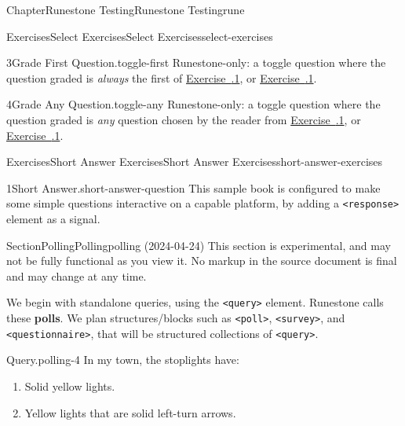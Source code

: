 \documentclass[oneside,10pt,]{book}
\newcommand{\xreffont}{\relax}
\newcommand{\mono}[1]{\texttt{#1}}
\newcommand{\terminology}[1]{\textbf{#1}}
\numberwithin{equation}{section}
\begin{document}
\begin{chapterptx}{Chapter}{Runestone Testing}{}{Runestone Testing}{}{}{rune}
\begin{exercises-section}{Exercises}{Select Exercises}{}{Select Exercises}{}{}{select-exercises}
\begin{divisionexercise}{3}{Grade First Question.}{}{toggle-first}
Runestone-only: a toggle question where the question graded is \emph{always} the first of \hyperlink{vector-space-dimension}{Exercise~{\xreffont 5.8.1}}, or \hyperlink{multiple-choice-not-randomized}{Exercise~{\xreffont 5.9.1}}.%
\end{divisionexercise}%
\begin{divisionexercise}{4}{Grade Any Question.}{}{toggle-any}%
Runestone-only: a toggle question where the question graded is \emph{any} question chosen by the reader from \hyperlink{vector-space-dimension}{Exercise~{\xreffont 5.8.1}}, or \hyperlink{multiple-choice-not-randomized}{Exercise~{\xreffont 5.9.1}}.%
\end{divisionexercise}%
\end{exercises-section}
%
%
\typeout{************************************************}
\typeout{************************************************}
%
\begin{exercises-section}{Exercises}{Short Answer Exercises}{}{Short Answer Exercises}{}{}{short-answer-exercises}
\begin{divisionexercise}{1}{Short Answer.}{}{short-answer-question}%
This sample book is configured to make some simple questions interactive on a capable platform, by adding a \mono{<response>} element as a signal.%
\end{divisionexercise}%
\end{exercises-section}
%
%
\typeout{************************************************}
\typeout{************************************************}
%
\begin{sectionptx}{Section}{Polling}{}{Polling}{}{}{polling}
(2024-04-24) This section is experimental, and may not be fully functional as you view it.  No markup in the source document is final and may change at any time.%
\par
We begin with standalone queries, using the \mono{<query>} element.  Runestone calls these \terminology{polls}.   We plan structures\slash{}blocks such as \mono{<poll>}, \mono{<survey>}, and \mono{<questionnaire>}, that will be structured collections of \mono{<query>}.%
\begin{paragraphs}{Query.}{polling-4}%
In my town, the stoplights have:%
\par
%
\begin{enumerate}
\item{}Solid yellow lights.%
%
\item{}Yellow lights that are solid left-turn arrows.%

\end{enumerate}
\end{paragraphs}
\end{sectionptx}
\end{chapterptx}
\end{document}
